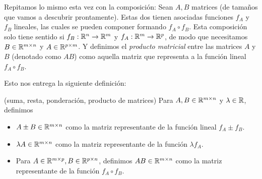 Repitamos lo mismo esta vez con la composición: Sean $A, B$ matrices (de tamaños que vamos a descubrir prontamente). Estas dos tienen asociadas funciones $f_A$ y $f_B$ lineales, las cuales se pueden componer formando $f_A \circ f_B$. Esta composición solo tiene sentido si $f_B : \mathbb{R}^n \to \mathbb{R}^m$ y $f_A: \mathbb{R}^m \to \mathbb{R}^p$, de modo que necesitamos $B \in \mathbb{R}^{m \times n}$ y $A \in \mathbb{R}^{p \times m}$. Y definimos el \textit{producto matricial} entre las matrices $A$ y $B$ (denotado como $AB$) como aquella matriz que representa a la función lineal $f_A \circ f_B$.

Esto nos entrega la siguiente definición:

\begin{definition}(suma, resta, ponderación, producto de matrices)
    Para $A, B \in \mathbb{R}^{m \times n}$ y $\lambda \in \mathbb{R}$, definimos
    \begin{itemize}
        \item $A \pm B \in \mathbb{R}^{m \times n}$ como la matriz representante de la función lineal $f_A \pm f_B$.
        \item $\lambda A \in \mathbb{R}^{m \times n}$ como la matriz representante de la función $\lambda f_A$.
        \item Para $A \in \mathbb{R}^{m \times p}, B \in \mathbb{R}^{p \times n}$, definimos $AB \in \mathbb{R}^{m \times n}$ como la matriz representante de la función $f_A \circ f_B$.
    \end{itemize}
\end{definition}

